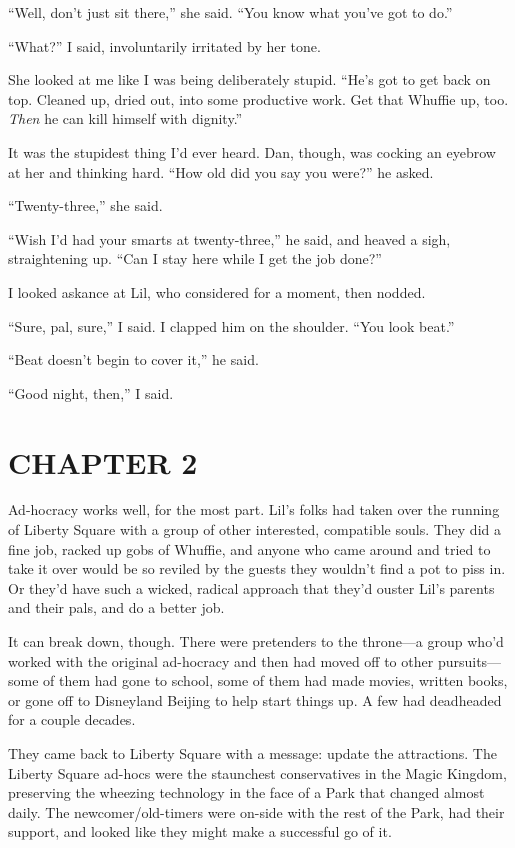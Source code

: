“Well, don't just sit there,” she said. “You know what you've got
to do.”

“What?” I said, involuntarily irritated by her tone.

She looked at me like I was being deliberately stupid. “He's got to
get back on top. Cleaned up, dried out, into some productive work.
Get that Whuffie up, too. \emph{Then} he can kill himself with
dignity.”

It was the stupidest thing I'd ever heard. Dan, though, was cocking
an eyebrow at her and thinking hard. “How old did you say you
were?” he asked.

“Twenty-three,” she said.

“Wish I'd had your smarts at twenty-three,” he said, and heaved a
sigh, straightening up. “Can I stay here while I get the job
done?”

I looked askance at Lil, who considered for a moment, then nodded.

“Sure, pal, sure,” I said. I clapped him on the shoulder. “You look
beat.”

“Beat doesn't begin to cover it,” he said.

“Good night, then,” I said.

\section{CHAPTER 2}

Ad-hocracy works well, for the most part. Lil's folks had taken
over the running of Liberty Square with a group of other
interested, compatible souls. They did a fine job, racked up gobs
of Whuffie, and anyone who came around and tried to take it over
would be so reviled by the guests they wouldn't find a pot to piss
in. Or they'd have such a wicked, radical approach that they'd
ouster Lil's parents and their pals, and do a better job.

It can break down, though. There were pretenders to the throne—a
group who'd worked with the original ad-hocracy and then had moved
off to other pursuits—some of them had gone to school, some of them
had made movies, written books, or gone off to Disneyland Beijing
to help start things up. A few had deadheaded for a couple
decades.

They came back to Liberty Square with a message: update the
attractions. The Liberty Square ad-hocs were the staunchest
conservatives in the Magic Kingdom, preserving the wheezing
technology in the face of a Park that changed almost daily. The
newcomer/old-timers were on-side with the rest of the Park, had
their support, and looked like they might make a successful go of
it.

